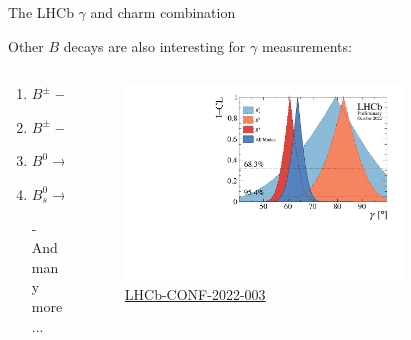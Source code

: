 \documentclass[dvipsnames]{beamer}
\begin{document}
\begin{frame}{The LHCb $\gamma$ and charm combination}
  \begin{center}
    \Large Other $B$ decays are also interesting for $\gamma$ measurements:
  \end{center}
  \vspace{0.2cm}
  \begin{columns}
    \begin{column}{0.4\textwidth}
      \vspace{1.5cm}
      \begin{enumerate}
        \item{$B^\pm\to DK^\pm$}
        \item{$B^\pm\to D^{*0}K^\pm$}
        \item{$B^0\to DK^{*0}$}
        \item{$B_s^0\to D_s^-K^+$}
        \item[-]{And many more...}
      \end{enumerate}
      \vspace{1.5cm}
    \end{column}
    \begin{column}{0.6\textwidth}
      \begin{figure}
        \centering
        \includegraphics[width=0.8\textwidth]{Plots/gammacharm_lhcb_comp_flavour.pdf}
        \vspace{-0.5cm}
        \caption*{\tiny\href{https://lhcbproject.web.cern.ch/Publications/LHCbProjectPublic/LHCb-CONF-2022-003.html}{LHCb-CONF-2022-003}}
      \end{figure}
    \end{column}
  \end{columns}
\end{frame}
\end{document}

